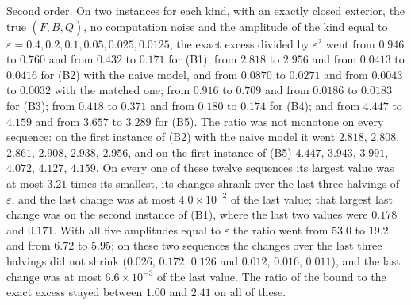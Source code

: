 \begin{numcheck}
Second order. On two instances for each kind, with an exactly closed exterior, the true $(\bar F,\bar B,\bar Q)$, no computation noise and the amplitude of the kind equal to $\varepsilon=0.4,0.2,0.1,0.05,0.025,0.0125$, the exact excess divided by $\varepsilon^2$ went from $0.946$ to $0.760$ and from $0.432$ to $0.171$ for (B1); from $2.818$ to $2.956$ and from $0.0413$ to $0.0416$ for (B2) with the naive model, and from $0.0870$ to $0.0271$ and from $0.0043$ to $0.0032$ with the matched one; from $0.916$ to $0.709$ and from $0.0186$ to $0.0183$ for (B3); from $0.418$ to $0.371$ and from $0.180$ to $0.174$ for (B4); and from $4.447$ to $4.159$ and from $3.657$ to $3.289$ for (B5). The ratio was not monotone on every sequence: on the first instance of (B2) with the naive model it went $2.818$, $2.808$, $2.861$, $2.908$, $2.938$, $2.956$, and on the first instance of (B5) $4.447$, $3.943$, $3.991$, $4.072$, $4.127$, $4.159$. On every one of these twelve sequences its largest value was at most $3.21$ times its smallest, its changes shrank over the last three halvings of $\varepsilon$, and the last change was at most $4.0\times10^{-2}$ of the last value; that largest last change was on the second instance of (B1), where the last two values were $0.178$ and $0.171$. With all five amplitudes equal to $\varepsilon$ the ratio went from $53.0$ to $19.2$ and from $6.72$ to $5.95$; on these two sequences the changes over the last three halvings did not shrink ($0.026$, $0.172$, $0.126$ and $0.012$, $0.016$, $0.011$), and the last change was at most $6.6\times10^{-3}$ of the last value. The ratio of the bound to the exact excess stayed between $1.00$ and $2.41$ on all of these.


\end{numcheck}
